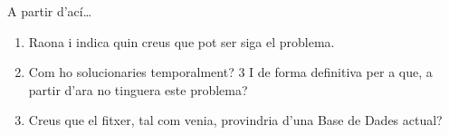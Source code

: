 \documentclass[
  12 pt,
  a4paper,
]{article}
\providecommand{\tightlist}{%
  \setlength{\itemsep}{0pt}\setlength{\parskip}{0pt}}
\begin{document}
A partir d'ací\ldots{}

\begin{enumerate}
\def\labelenumi{\arabic{enumi}.}
\tightlist
\item
  Raona i indica quin creus que pot ser siga el problema.
\item
  Com ho solucionaries temporalment? 3 I de forma definitiva per a que,
  a partir d'ara no tinguera este problema?
\item
  Creus que el fitxer, tal com venia, provindria d'una Base de Dades
  actual?
\end{enumerate}
\end{document}
